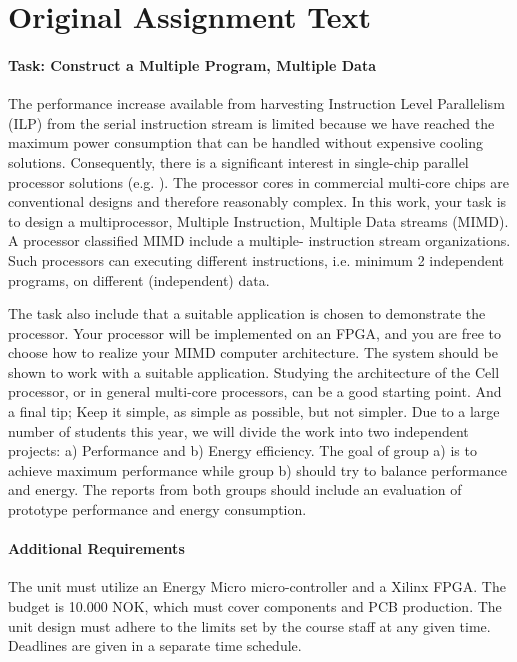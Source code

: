 \section{Original Assignment Text}\label{intro:original-text}

\paragraph{Task: Construct a Multiple Program, Multiple Data}
The performance increase available from harvesting Instruction Level Parallelism
(ILP) from the serial instruction stream is limited because we have reached the
maximum power consumption that can be handled without expensive cooling
solutions\cite{olukotun}. Consequently, there is a significant interest in
single-chip parallel processor solutions (e.g. \cite{bell,kongetira}). The
processor cores in commercial multi-core chips are conventional designs and
therefore reasonably complex. In this work, your task is to design a
multiprocessor, Multiple Instruction, Multiple Data streams (MIMD). A processor
classified MIMD include a multiple- instruction stream
organizations\cite{flynn}. Such processors can executing different instructions,
i.e. minimum 2 independent programs, on different (independent) data.

The task also include that a suitable application is chosen to demonstrate the
processor. Your processor will be implemented on an FPGA, and you are free to
choose how to realize your MIMD computer architecture. The system should be
shown to work with a suitable application. Studying the architecture of the
Cell processor\cite{wiki_cell_mpu}, or in general multi-core
processors\cite{wiki_multicore}, can be a good starting point. And a final tip;
Keep it simple, as simple as possible, but not simpler. Due to a large number of
students this year, we will divide the work into two independent projects: a)
Performance and b) Energy efficiency. The goal of group a) is to achieve maximum
performance while group b) should try to balance performance and energy. The
reports from both groups should include an evaluation of prototype performance
and energy consumption.

\paragraph{Additional Requirements}
The unit must utilize an Energy Micro micro-controller and a Xilinx FPGA. The
budget is 10.000 NOK, which must cover components and PCB production. The unit
design must adhere to the limits set by the course staff at any given time.
Deadlines are given in a separate time schedule.

